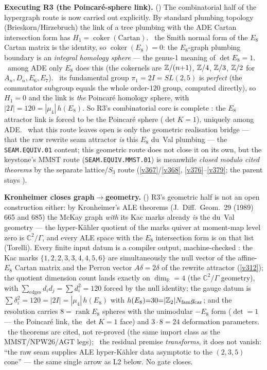 \noindent\textbf{Executing R3 (the Poincar\'e-sphere link).}
()
The combinatorial half of the hypergraph route is now carried out explicitly. By standard plumbing topology
(Brieskorn/Hirzebruch) the link of a tree plumbing with the ADE Cartan intersection form has
$H_1=\operatorname{coker}(\mathrm{Cartan})$. \mE\ the Smith normal form of the $E_8$ Cartan matrix is the identity,
so $\operatorname{coker}(E_8)=0$: the $E_8$-graph plumbing boundary is an \emph{integral homology sphere} --- the
genus-1 meaning of $\det E_8{=}1$. \mE\ among ADE only $E_8$ does this (the cokernels are
$\mathbb Z/(n{+}1)$, $\mathbb Z/4$, $\mathbb Z/3$, $\mathbb Z/2$ for $A_n,D_n,E_6,E_7$). \mE\ its fundamental group $\pi_1=2I=SL(2,5)$ is
\emph{perfect} (the commutator subgroup equals the whole order-$120$ group, computed directly), so $H_1=0$ and the
link is \emph{the} Poincar\'e homology sphere, with $|2I|=120=|\mu_4|\,h(E_8)$. So R3's combinatorial core is
complete \mE: the $E_8$ attractor link is forced to be the Poincar\'e sphere ($\det K{=}1$), uniquely among ADE.
\mO\ what this route leaves open is only the geometric realisation bridge --- that the raw rewrite seam attractor
\emph{is} this $E_8$ du~Val plumbing --- the \texttt{SEAM.EQUIV.01} content; this geometric route does not close it
on its own, but the keystone's MMST route (\texttt{SEAM.EQUIV.MMST.01}) is meanwhile \emph{closed modulo cited
theorems} by the separate lattice/$S_3$ route
(\vref{v367}/\vref{v368}, \vref{v376}--\vref{v379}; the parent stays \mO).

\par\smallskip\noindent\textbf{Kronheimer closes graph$\to$geometry.}
()
R3's geometric half is not an open construction either: by Kronheimer's ALE theorems
(J.~Diff.~Geom.~29 (1989) 665 and 685) the McKay graph \emph{with} its Kac marks already \emph{is} the du~Val
geometry --- the hyper-K\"ahler quotient of the marks quiver at moment-map level zero is $\mathbb{C}^2/\Gamma$, and
every ALE space with the $E_8$ intersection form is on that list (Torelli). Every finite input datum is a
compiler output, machine-checked \mE: the Kac marks $\{1,2,2,3,3,4,4,5,6\}$ are simultaneously the null vector
of the affine-$E_8$ Cartan matrix and the Perron vector $A\delta{=}2\delta$ of the rewrite attractor
(\vref{v312}); the quotient dimension count lands exactly on $\dim_{\mathbb R}=4$ (the $\mathbb{C}^2/\Gamma$ geometry), with
$\sum_{\text{edges}}d_id_j{=}\sum d_i^2{=}120$ forced by the null identity; the gauge datum is
$\sum\delta_i^2{=}120{=}|2I|{=}|\mu_4|\,h(E_8)$ with $h(E_8){=}30{=}|\mathbb Z_2|N_{\mathrm{fam}}g_{\mathrm{car}}$; and the resolution carries
$8{=}\operatorname{rank}E_8$ spheres with the unimodular $-E_8$ form ($\det{=}1$ --- the Poincar\'e link, the
$\det K{=}1$ face) and $3\cdot8{=}24$ deformation parameters. \mC\ the theorems are cited, not re-proved (the
same import class as the MMST/NPW26/AGT legs); \mO\ the residual premise \emph{transforms}, it does not vanish:
``the raw seam supplies ALE hyper-K\"ahler data asymptotic to the $(2,3,5)$ cone'' --- the same single arrow as
L2 below. No gate closes.

